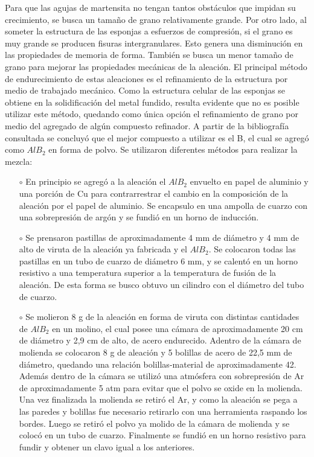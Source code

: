 \documentclass[a4paper,12pt,fleqn,twoside,openany]{book}
\begin{document}
Para que las agujas de martensita no tengan tantos obstáculos que impidan su crecimiento, se busca un tamaño de grano relativamente grande. Por otro 
lado, al someter la estructura de las esponjas a esfuerzos de compresión, si el grano es muy grande se producen fisuras intergranulares. Esto genera 
una disminución en las propiedades de memoria de forma. También se busca un menor tamaño de grano para mejorar las propiedades mecánicas de la aleación.
El principal método de endurecimiento de estas aleaciones es el refinamiento de la estructura por medio de trabajado mecánico. Como la estructura 
celular de las esponjas se obtiene en la solidificación del metal fundido, resulta evidente que no es posible utilizar este método, quedando como 
única opción el refinamiento de grano por medio del agregado de algún compuesto refinador. A partir de la bibliografía consultada se concluyó que el 
mejor compuesto a utilizar es el B, el cual se agregó como $AlB_2$ en forma de polvo. Se utilizaron diferentes métodos para realizar la mezcla:
\begin{itemize}
\item[$\circ$] En principio se agregó a la aleación el $AlB_2$ envuelto en papel de aluminio y una porción de Cu para contrarrestrar el cambio en la 
composición de la aleación por el papel de  aluminio. Se encapsulo en una ampolla de cuarzo con una sobrepresión de argón y se fundió en un horno de 
inducción.
\item[$\circ$] Se prensaron pastillas de aproximadamente 4 mm de diámetro y 4 mm de alto de viruta de la aleación ya fabricada y el $AlB_2$. Se 
colocaron todas las pastillas en un tubo de cuarzo de diámetro 6 mm, y se calentó en un horno resistivo a una temperatura superior a la temperatura 
de fusión de la aleación. De esta forma se busco obtuvo un cilindro con el diámetro del tubo de cuarzo.
\item[$\circ$] Se molieron 8 g de la aleación en forma de viruta con distintas cantidades de $AlB_2$ en un molino, el cual posee una cámara de 
aproximadamente 20 cm de diámetro y 2,9 cm de alto, de acero endurecido. Adentro de la cámara de molienda se colocaron 8 g de aleación y 5 bolillas 
de acero de 22,5 mm de diámetro, quedando una relación bolillas-material de aproximadamente 42. Además dentro de la cámara se utilizó una atmósfera 
con sobrepresión de Ar de aproximadamente 5 atm para evitar que el polvo se oxide en la molienda. Una vez finalizada la molienda se retiró el Ar, y 
como la aleación se pega a las paredes y bolillas fue necesario retirarlo con una herramienta raspando los bordes.
Luego se retiró el polvo ya molido de la cámara de molienda y se colocó en un tubo de cuarzo. Finalmente se fundió en un horno resistivo para fundir 
y obtener un clavo igual a los anteriores.
\end{itemize}
\end{document}
